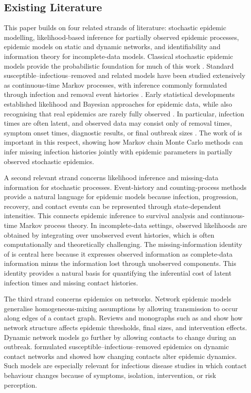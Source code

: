 \documentclass[10pt]{article}
\begin{document}
\subsection{Existing Literature}
This paper builds on four related strands of literature: stochastic epidemic modelling, likelihood-based inference for partially observed epidemic processes, epidemic models on static and dynamic networks, and identifiability and information theory for incomplete-data models. Classical stochastic epidemic models provide the probabilistic foundation for much of this work \citep{daley1999epidemic}. Standard susceptible--infectious--removed and related models have been studied extensively as continuous-time Markov processes, with inference commonly formulated through infection and removal event histories \citep{hethcote2000mathematics}. Early statistical developments established likelihood and Bayesian approaches for epidemic data, while also recognising that real epidemics are rarely fully observed \citep{bu2022likelihood, reeves2024model, morsomme2025exact}. In particular, infection times are often latent, and observed data may consist only of removal times, symptom onset times, diagnostic results, or final outbreak sizes \citep{becker1999statistical, morsomme2025exact, kamkumo2025estimating}. The work of \citet{o1999bayesian} is important in this respect, showing how Markov chain Monte Carlo methods can infer missing infection histories jointly with epidemic parameters in partially observed stochastic epidemics.

A second relevant strand concerns likelihood inference and missing-data information for stochastic processes. Event-history and counting-process methods provide a natural language for epidemic models because infection, progression, recovery, and contact events can be represented through state-dependent intensities. This connects epidemic inference to survival analysis and continuous-time Markov process theory. In incomplete-data settings, observed likelihoods are obtained by integrating over unobserved event histories, which is often computationally and theoretically challenging. The missing-information identity of \citet{louis1982finding} is central here because it expresses observed information as complete-data information minus the information lost through unobserved components. This identity provides a natural basis for quantifying the inferential cost of latent infection times and missing contact histories.

The third strand concerns epidemics on networks. Network epidemic models generalise homogeneous-mixing assumptions by allowing transmission to occur along edges of a contact graph. Reviews and monographs such as \citet{pastor2015epidemic} and \citet{istvan2019mathematics} show how network structure affects epidemic thresholds, final sizes, and intervention effects. Dynamic network models go further by allowing contacts to change during an outbreak. \citet{volz2007susceptible} formulated susceptible--infectious--removed epidemics on dynamic contact networks and showed how changing contacts alter epidemic dynamics. Such models are especially relevant for infectious disease studies in which contact behaviour changes because of symptoms, isolation, intervention, or risk perception.
\end{document}
